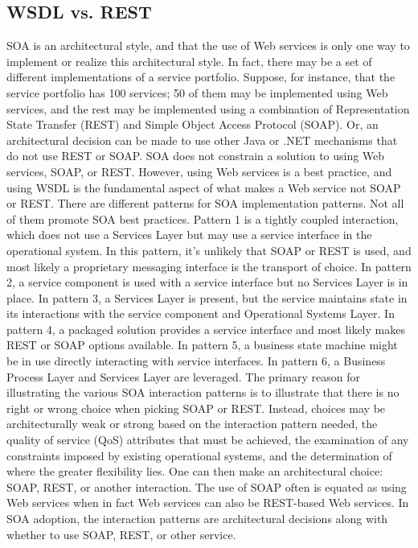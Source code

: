 \documentclass[12pt,a4paper,final,twoside,onecolumn,titlepage]{book}
\begin{document}
\subsection{WSDL vs. REST}
\gls{SOA} is an architectural style, and that the use of Web services is only one way to implement or realize this architectural style. In fact, there may be a set of different implementations of a service portfolio. Suppose, for instance, that the service portfolio has 100 services; 50 of them may be implemented using Web services, and the rest may be implemented using a combination of Representation State Transfer (REST) and Simple Object Access Protocol (\gls{SOAP}). Or, an architectural decision can be made to use other Java or .NET mechanisms that do not use REST or \gls{SOAP}. \gls{SOA} does not constrain a solution to using Web services, \gls{SOAP}, or REST. However, using Web services is a best practice, and using \gls{WSDL} is the fundamental aspect of what makes a Web service not \gls{SOAP} or REST. There are different patterns for \gls{SOA} implementation patterns. Not all of them promote \gls{SOA} best practices. Pattern 1 is a tightly coupled interaction, which does not use a Services Layer but may use a service interface in the operational system. In this pattern, it’s unlikely that \gls{SOAP} or REST is used, and most likely a proprietary messaging interface is the transport of choice. In pattern 2, a service component is used with a service interface but no Services Layer is in place. In pattern 3, a Services Layer is present, but the service maintains state in its interactions with the service component and Operational Systems Layer. In pattern 4, a packaged solution provides a service interface and most likely makes REST or \gls{SOAP} options available. In pattern 5, a business state machine might be in use directly interacting with service interfaces. In pattern 6, a Business Process Layer and Services Layer are leveraged. The primary reason for illustrating the various \gls{SOA} interaction patterns is to illustrate that there is no right or wrong choice when picking \gls{SOAP} or REST. Instead, choices may be architecturally weak or strong based on the interaction pattern needed, the quality of service (QoS) attributes that must be achieved, the examination of any constraints imposed by existing operational systems, and the determination of where the greater flexibility lies. One can then make an architectural choice: \gls{SOAP}, REST, or another interaction. The use of \gls{SOAP} often is equated as using Web services when in fact Web services can also be REST-based Web services. In \gls{SOA} adoption, the interaction patterns are architectural decisions along with whether to use \gls{SOAP}, REST, or other service.
\end{document}

